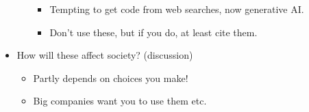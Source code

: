 \documentclass{article}
\begin{document}
\begin{itemize}
\begin{itemize}
    \begin{itemize}

    \item
      Tempting to get code from web searches, now generative AI.
    \item
      Don't use these, but if you do, at least cite them.
    \end{itemize}
  \end{itemize}
\item
  How will these affect society? (discussion)

  \begin{itemize}

  \item
    Partly depends on choices you make!
  \item
    Big companies want you to use them etc.
  \end{itemize}
\end{itemize}
\end{document}
